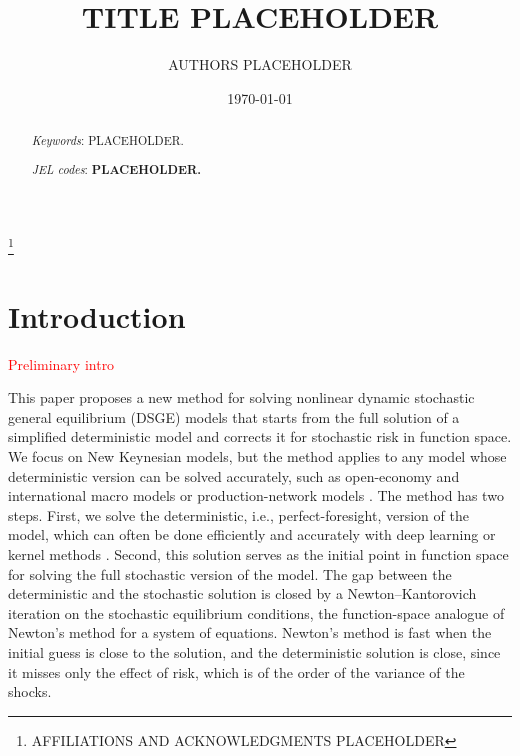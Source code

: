 \documentclass[12pt]{article}
\newcommand\blfootnote[1]{%
\begingroup
\renewcommand\thefootnote{}\footnote{#1}%
\addtocounter{footnote}{-1}%
\endgroup
}
\begin{document}
\title{TITLE PLACEHOLDER}

\author{AUTHORS PLACEHOLDER}

\date{\today}

\maketitle\blfootnote{AFFILIATIONS AND ACKNOWLEDGMENTS PLACEHOLDER}

\begin{abstract}
\noindent
\singlespace

\textit{Keywords}{\small: PLACEHOLDER.}

\textit{JEL codes}{\small: {\bf PLACEHOLDER.}}

\end{abstract}

\newpage

\section{Introduction}\label{sec:introduction}

\textcolor{red}{Preliminary intro}

This paper proposes a new method for solving nonlinear dynamic stochastic general
equilibrium (DSGE) models that starts from the full solution of
a simplified deterministic model and corrects it for stochastic risk in function space.
We focus on New Keynesian models, but the method applies to any model whose
deterministic version can be solved accurately, such as open-economy and
international macro models or production-network models \citep{fernandezvillaverde2026production}. The method has
two steps. First, we solve the deterministic, i.e., perfect-foresight, version
of the model, which can often be done efficiently and accurately with deep
learning or kernel methods \citep{kahou2024spooky, kahou2026kernel}. Second,
this solution serves as the initial point in function space for solving the
full stochastic version of the model. The gap between the deterministic and
the stochastic solution is closed by a
Newton--Kantorovich iteration on the stochastic equilibrium conditions, the
function-space analogue of Newton's method for a system of equations. Newton's
method is fast when the initial guess is close to the solution, and the
deterministic solution is close, since it misses only the effect of risk, which
is of the order of the variance of the shocks.
\end{document}

